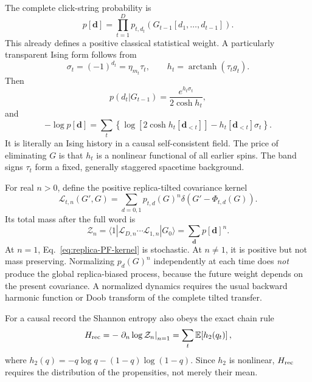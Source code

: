 \documentclass[
  aps,prx,twocolumn,superscriptaddress,longbibliography,
  nofootinbib,floatfix
]{revtex4-2}
\newcommand{\E}{\mathbb{E}}
\newcommand{\cL}{\mathcal{L}}
\newcommand{\cZ}{\mathcal{Z}}
\theoremstyle{plain}
\theoremstyle{definition}
\begin{document}
The complete click-string probability is
\begin{equation}
 p[\bm d]
 =\prod_{t=1}^{D}p_{t,d_t}\!\left(G_{t-1}[d_1,\ldots,d_{t-1}]\right).
 \label{eq:defect-string-probability}
\end{equation}
This already defines a positive classical statistical weight.  A particularly
transparent Ising form follows from
\begin{equation}
 \sigma_t=(-1)^{d_t}=\eta_{m_t}\tau_t,
 \qquad
 h_t=\operatorname{arctanh}(\tau_t g_t).
 \label{eq:ising-variables}
\end{equation}
Then
\begin{equation}
 p(d_t|G_{t-1})
 =\frac{e^{h_t\sigma_t}}{2\cosh h_t},
 \label{eq:causal-Ising-weight}
\end{equation}
and
\begin{equation}
 -\log p[\bm d]
 =\sum_t\left\{\log[2\cosh h_t[\bm d_{<t}]]
 -h_t[\bm d_{<t}]\sigma_t\right\}.
 \label{eq:causal-Ising-action}
\end{equation}
It is literally an Ising history in a causal self-consistent field.  The price
of eliminating \(G\) is that \(h_t\) is a nonlinear functional of all earlier
spins.  The band signs \(\tau_t\) form a fixed, generally staggered spacetime
background.

For real \(n>0\), define the positive replica-tilted covariance kernel
\begin{equation}
 \cL_{t,n}(G',G)
 =\sum_{d=0,1}p_{t,d}(G)^n
 \delta\!\left(G'-\Phi_{t,d}(G)\right).
 \label{eq:replica-PF-kernel}
\end{equation}
Its total mass after the full word is
\begin{equation}
 \boxed{
 \cZ_n=\langle 1|\cL_{D,n}\cdots\cL_{1,n}|G_0\rangle
 =\sum_{\bm d}p[\bm d]^n.}
 \label{eq:PF-Zn}
\end{equation}
At \(n=1\), Eq.~\eqref{eq:replica-PF-kernel} is stochastic.  At
\(n\neq1\), it is positive but not mass preserving.  Normalizing
\(p_d(G)^n\) independently at each time does \emph{not} produce the global
replica-biased process, because the future weight depends on the present
covariance.  A normalized dynamics requires the usual backward harmonic
function or Doob transform of the complete tilted transfer.

For a causal record the Shannon entropy also obeys the exact chain rule
\begin{equation}
 H_{\rm rec}
 =-\left.\partial_n\log\cZ_n\right|_{n=1}
 =\sum_t\E\!\left[h_2(q_t)\right],
 \label{eq:shannon-chain-rule}
\end{equation}
where \(h_2(q)=-q\log q-(1-q)\log(1-q)\).  Since \(h_2\) is nonlinear,
\(H_{\rm rec}\) requires the distribution of the propensities, not merely
their mean.
\end{document}
